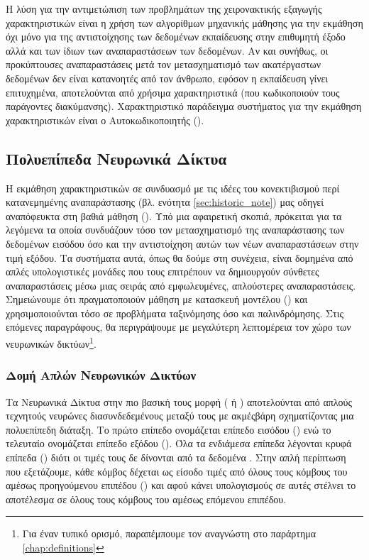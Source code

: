 Η λύση για την αντιμετώπιση των προβλημάτων της χειρονακτικής εξαγωγής χαρακτηριστικών είναι η χρήση των αλγορίθμων μηχανικής μάθησης για την εκμάθηση όχι μόνο για της αντιστοίχησης των δεδομένων εκπαίδευσης στην επιθυμητή έξοδο αλλά και των ίδιων των αναπαραστάσεων των δεδομένων. Αν και συνήθως, οι προκύπτουσες αναπαραστάσεις μετά τον μετασχηματισμό των ακατέργαστων δεδομένων δεν είναι κατανοητές από τον άνθρωπο, εφόσον η εκπαίδευση γίνει επιτυχημένα, αποτελούνται από χρήσιμα χαρακτηριστικά (που κωδικοποιούν τους παράγοντες διακύμανσης).
Χαρακτηριστικό παράδειγμα συστήματος για την εκμάθηση χαρακτηριστικών είναι ο Αυτοκωδικοποιητής ().

\subsection{Πολυεπίπεδα Νευρωνικά Δίκτυα}

Η εκμάθηση χαρακτηριστικών σε συνδυασμό με τις ιδέες του κονεκτιβισμού περί κατανεμημένης αναπαράστασης (βλ. ενότητα \ref{sec:historic_note}) μας οδηγεί αναπόφευκτα στη βαθιά μάθηση (). Υπό μια αφαιρετική σκοπιά, πρόκειται για τα λεγόμενα  τα οποία συνδυάζουν τόσο τον μετασχηματισμό της αναπαράστασης των δεδομένων εισόδου όσο και την αντιστοίχηση αυτών των νέων αναπαραστάσεων στην τιμή εξόδου. Τα συστήματα αυτά, όπως θα δούμε στη συνέχεια, είναι δομημένα από απλές υπολογιστικές μονάδες που τους επιτρέπουν να δημιουργούν σύνθετες αναπαραστάσεις μέσω μιας σειράς από εμφωλευμένες, απλούστερες αναπαραστάσεις. Σημειώνουμε ότι πραγματοποιούν μάθηση με κατασκευή μοντέλου () και χρησιμοποιούνται τόσο σε προβλήματα ταξινόμησης όσο και παλινδρόμησης. Στις επόμενες παραγράφους, θα περιγράψουμε με μεγαλύτερη λεπτομέρεια τον χώρο των νευρωνικών δικτύων\footnote{Για έναν τυπικό ορισμό, παραπέμπουμε τον αναγνώστη στο παράρτημα \ref{chap:definitions}}.

\subsubsection{Δομή Απλών Νευρωνικών Δικτύων}
\label{sec:_vanilla_nn}
Τα Νευρωνικά Δίκτυα στην πιο βασική τους μορφή ( ή ) αποτελούνται από απλούς τεχνητούς νευρώνες διασυνδεδεμένους μεταξύ τους με ακμές\textendash βάρη σχηματίζοντας μια πολυεπίπεδη διάταξη. Το πρώτο επίπεδο ονομάζεται επίπεδο εισόδου () ενώ το τελευταίο ονομάζεται επίπεδο εξόδου (). Όλα τα ενδιάμεσα επίπεδα λέγονται κρυφά επίπεδα () διότι οι τιμές τους δε δίνονται από τα δεδομένα \cite{goodfellow2016deep}. Στην απλή περίπτωση που εξετάζουμε, κάθε κόμβος δέχεται ως είσοδο τιμές από όλους τους κόμβους του αμέσως προηγούμενου επιπέδου () και αφού κάνει υπολογισμούς σε αυτές στέλνει το αποτέλεσμα σε όλους τους κόμβους του αμέσως επόμενου επιπέδου.
\par
                  
